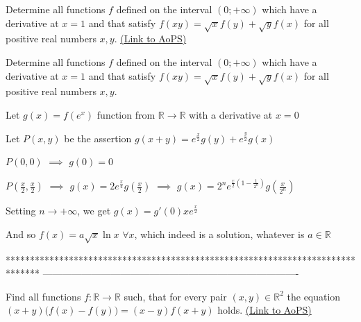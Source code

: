 \begin{problem}
	Determine all functions $f$ defined on the interval $(0;+\infty)$ which have a derivative at $x=1$ and that satisfy $f(xy)=\sqrt{x}f(y)+\sqrt{y}f(x)$ for all positive real numbers $x,y$.
	\flushright \href{https://artofproblemsolving.com/community/c6h563323}{(Link to AoPS)}
\end{problem}



\begin{solution}
	\begin{tcolorbox}Determine all functions $f$ defined on the interval $(0;+\infty)$ which have a derivative at $x=1$ and that satisfy $f(xy)=\sqrt{x}f(y)+\sqrt{y}f(x)$ for all positive real numbers $x,y$.\end{tcolorbox}
Let $g(x)=f(e^x)$ function from $\mathbb R\to\mathbb R$ with a derivative at $x=0$

Let $P(x,y)$ be the assertion $g(x+y)=e^{\frac x2}g(y)+e^{\frac y2}g(x)$

$P(0,0)$ $\implies$ $g(0)=0$

$P(\frac x2,\frac x2)$ $\implies$ $g(x)=2e^{\frac x4}g(\frac x2)$ $\implies$ $g(x)=2^ne^{\frac x2(1-\frac 1{2^n})}g(\frac x{2^n})$

Setting $n\to+\infty$, we get $g(x)=g'(0)xe^{\frac x2}$

And so $\boxed{f(x)=a\sqrt x\ln x}$ $\forall x$, which indeed is a solution, whatever is $a\in\mathbb R$
\end{solution}
*******************************************************************************
-------------------------------------------------------------------------------

\begin{problem}
	Find all functions $f:\mathbb{R}\to\mathbb{R}$ such, that for every pair $(x,y)\in\mathbb{R}^2$ the equation
$(x+y)\big(f(x)-f(y)\big)=(x-y)f(x+y)$
holds.
	\flushright \href{https://artofproblemsolving.com/community/c6h563332}{(Link to AoPS)}
\end{problem}



